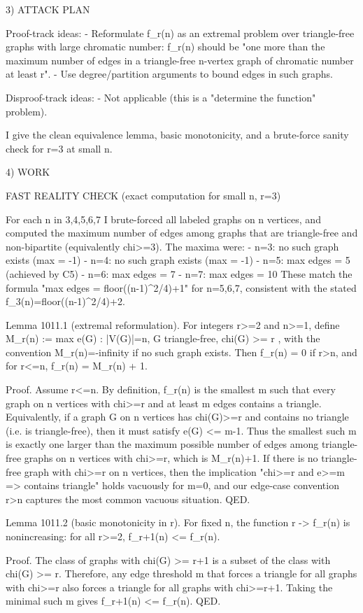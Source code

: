 3) ATTACK PLAN

Proof-track ideas:
- Reformulate f_r(n) as an extremal problem over triangle-free graphs with large chromatic number: f_r(n) should be "one more than the maximum number of edges in a triangle-free n-vertex graph of chromatic number at least r".
- Use degree/partition arguments to bound edges in such graphs.

Disproof-track ideas:
- Not applicable (this is a "determine the function" problem).

I give the clean equivalence lemma, basic monotonicity, and a brute-force sanity check for r=3 at small n.

4) WORK

FAST REALITY CHECK (exact computation for small n, r=3)

For each n in {3,4,5,6,7} I brute-forced all labeled graphs on n vertices, and computed the maximum number of edges among graphs that are triangle-free and non-bipartite (equivalently chi>=3).
The maxima were:
- n=3: no such graph exists (max = -1)
- n=4: no such graph exists (max = -1)
- n=5: max edges = 5 (achieved by C5)
- n=6: max edges = 7
- n=7: max edges = 10
These match the formula "max edges = floor((n-1)^2/4)+1" for n=5,6,7, consistent with the stated f_3(n)=floor((n-1)^2/4)+2.

Lemma 1011.1 (extremal reformulation).
For integers r>=2 and n>=1, define
  M_r(n) := max{ e(G) : |V(G)|=n, G triangle-free, chi(G) >= r },
with the convention M_r(n)=-infinity if no such graph exists.
Then
  f_r(n) = 0 if r>n,
and for r<=n,
  f_r(n) = M_r(n) + 1.

Proof.
Assume r<=n. By definition, f_r(n) is the smallest m such that every graph on n vertices with chi>=r and at least m edges contains a triangle.
Equivalently, if a graph G on n vertices has chi(G)>=r and contains no triangle (i.e. is triangle-free), then it must satisfy e(G) <= m-1.
Thus the smallest such m is exactly one larger than the maximum possible number of edges among triangle-free graphs on n vertices with chi>=r, which is M_r(n)+1.
If there is no triangle-free graph with chi>=r on n vertices, then the implication "chi>=r and e>=m => contains triangle" holds vacuously for m=0, and our edge-case convention r>n captures the most common vacuous situation.
QED.

Lemma 1011.2 (basic monotonicity in r).
For fixed n, the function r -> f_r(n) is nonincreasing: for all r>=2,
  f_{r+1}(n) <= f_r(n).

Proof.
The class of graphs with chi(G) >= r+1 is a subset of the class with chi(G) >= r.
Therefore, any edge threshold m that forces a triangle for all graphs with chi>=r also forces a triangle for all graphs with chi>=r+1. Taking the minimal such m gives f_{r+1}(n) <= f_r(n).
QED.


